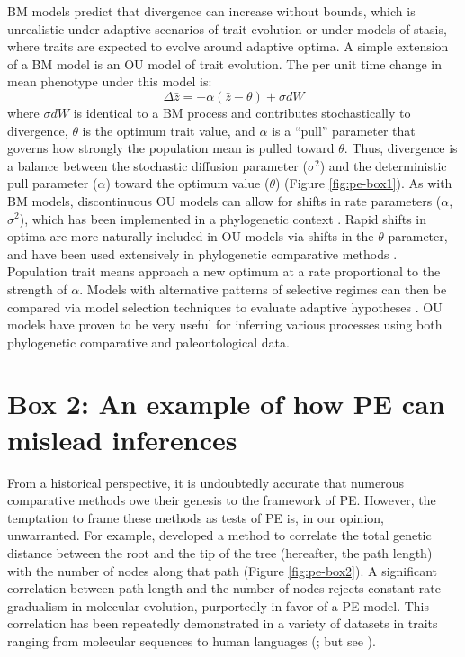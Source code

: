 BM models predict that divergence can increase without bounds, which is unrealistic under adaptive scenarios of trait evolution or under models of stasis, where traits are expected to evolve around adaptive optima. A simple extension of a BM model is an OU model of trait evolution. The per unit time change in mean phenotype under this model is:
\begin{equation}
\Delta \bar{z} = -\alpha(\bar{z}-\theta)+\sigma dW
\end{equation}
where $\sigma dW$ is identical to a BM process and contributes stochastically to divergence,  $\theta$ is the optimum trait value, and $\alpha$ is a ``pull'' parameter that governs how strongly the population mean is pulled toward $\theta$. Thus, divergence is a balance between the stochastic diffusion parameter ($\sigma^2$) and the deterministic pull parameter ($\alpha$) toward the optimum value ($\theta$) (Figure \ref{fig:pe-box1}). As with BM models, discontinuous OU models can allow for shifts in rate parameters ($\alpha$, $\sigma^2$), which has been implemented in a phylogenetic context \citep{Beaulieu2012}. Rapid shifts in optima are more naturally included in OU models via shifts in the $\theta$ parameter, and have been used extensively in phylogenetic comparative methods \citep{Hansen1997, ButlerKing2004, Beaulieu2012}. Population trait means approach a new optimum at a rate proportional to the strength of $\alpha$. Models with alternative patterns of selective regimes can then be compared via model selection techniques to evaluate adaptive hypotheses \citep{ButlerKing2004}. OU models have proven to be very useful for inferring various processes using both phylogenetic comparative \citep{Hansen2008, Mahler2013Science} and paleontological \citep{Hunt2008, Reitan2012} data.


\section{Box 2: An example of how PE can mislead inferences}
From a historical perspective, it is undoubtedly accurate that numerous comparative methods owe their genesis to the framework of PE. However, the temptation to frame these methods as tests of PE is, in our opinion, unwarranted. For example, \citet{Webster2003} developed a method to correlate the total genetic distance between the root and the tip of the tree (hereafter, the path length) with the number of nodes along that path (Figure \ref{fig:pe-box2}). A significant correlation between path length and the number of nodes rejects constant-rate gradualism in molecular evolution, purportedly in favor of a PE model. This correlation has been repeatedly demonstrated in a variety of datasets in traits ranging from molecular sequences to human languages (\citealt{Webster2003, Pagel2006, Atkinson2008, Lanfear2010}; but see \citealt{Goldie2011}).

